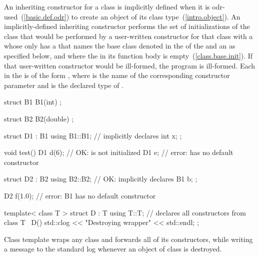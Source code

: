\pnum
An inheriting constructor for a class is implicitly defined when
it is odr-used~(\ref{basic.def.odr}) to
create an object of its class type~(\ref{intro.object}). An implicitly-defined inheriting
constructor performs the set of initializations of the class that would be performed by a
user-written  constructor for that class with a 
whose only  has a  that names the base
class denoted in the  of the
 and an  as specified below, and where
the  in its function body is empty~(\ref{class.base.init}). If that
user-written constructor would be ill-formed, the program is ill-formed. Each
 in the  is of the form
, where  is the name of the corresponding constructor
parameter and  is the declared type of .

\pnum
\enterexample

\begin{codeblock}
struct B1 {
  B1(int) { }
};

struct B2 {
  B2(double) { }
};

struct D1 : B1 {
  using B1::B1;     // implicitly declares 
  int x;
};

void test() {
  D1 d(6);          // OK:  is not initialized
  D1 e;             // error:  has no default constructor
}

struct D2 : B2 {
  using B2::B2;     // OK: implicitly declares 
  B1 b;
};

D2 f(1.0);          // error: B1 has no default constructor

template< class T >
struct D : T {
  using T::T;       // declares all constructors from class T
  ~D() { std::clog << "Destroying wrapper" << std::endl; }
};
\end{codeblock}

Class template  wraps any class and forwards all of its constructors,
while writing a message to the standard log whenever an object of class
 is destroyed. \exitexample%
